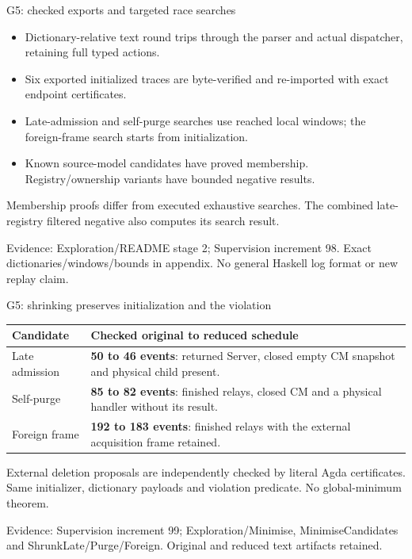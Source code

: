 \documentclass[11pt,aspectratio=169]{beamer}
\newcommand{\evidence}[1]{\vfill{\fontsize{7}{8}\selectfont\color{Muted}Evidence: #1\par}}
\begin{document}
\begin{frame}{G5: checked exports and targeted race searches}
\begin{itemize}\setlength\itemsep{2.5mm}
\item Dictionary-relative text round trips through the parser and actual dispatcher, retaining full typed actions.
\item Six exported initialized traces are byte-verified and re-imported with exact endpoint certificates.
\item Late-admission and self-purge searches use reached local windows; the foreign-frame search starts from initialization.
\item Known source-model candidates have proved membership. Registry/ownership variants have bounded negative results.
\end{itemize}\small Membership proofs differ from executed exhaustive searches. The combined late-registry filtered negative also computes its search result.
\evidence{Exploration/README stage 2; Supervision increment 98. Exact dictionaries/windows/bounds in appendix. No general Haskell log format or new replay claim.}
\end{frame}

\begin{frame}{G5: shrinking preserves initialization and the violation}
\small\renewcommand{\arraystretch}{1.2}
\begin{tabularx}{\textwidth}{@{}P{28mm}Y@{}}
\toprule
Candidate & Checked original to reduced schedule \\ \midrule
Late admission & \textbf{50 to 46 events}: returned Server, closed empty CM snapshot and physical child present. \\[2mm]
Self-purge & \textbf{85 to 82 events}: finished relays, closed CM and a physical handler without its result. \\[2mm]
Foreign frame & \textbf{192 to 183 events}: finished relays with the external acquisition frame retained. \\[2mm]
\bottomrule
\end{tabularx}\par\vspace{2mm}\small External deletion proposals are independently checked by literal Agda certificates. Same initializer, dictionary payloads and violation predicate. No global-minimum theorem.
\evidence{Supervision increment 99; Exploration/Minimise, MinimiseCandidates and ShrunkLate/Purge/Foreign. Original and reduced text artifacts retained.}
\end{frame}
\end{document}
